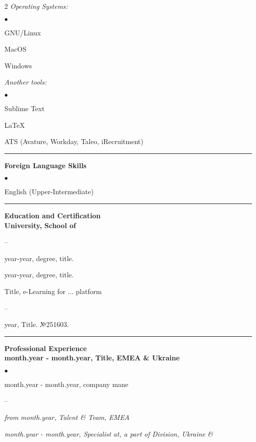 \documentclass[oneside,final,12pt]{extreport}
\newenvironment{compactlist}{
	\begin{list}{{$\bullet$}}{
		\setlength\leftmargin{0.4cm}
		\setlength\partopsep{0pt}
		\setlength\parskip{0pt}
		\setlength\parsep{0pt}
		\setlength\topsep{0pt}
		\setlength\itemsep{0pt}
	}
}{
	\end{list}
}
\newenvironment{innerlist}{
	\begin{list}{--}{
		\setlength\leftmargin{0.8cm}
		\setlength\partopsep{0pt}
		\setlength\parskip{0pt}
		\setlength\parsep{0pt}
		\setlength\topsep{0pt}
		\setlength\itemsep{0pt}
	}
}{
	\end{list}
}
\begin{document}
\begin{multicols}{2}
\textsl{Operating Systems:}
	\begin{compactlist}
		\item GNU/Linux
		\item MacOS
		\item Windows
	\end{compactlist}
\textsl{Another tools:}
	\begin{compactlist}
		\item Sublime Text
		\item LaTeX
		\item ATS (Avature, Workday, Taleo, iRecruitment)
	\end{compactlist}
\end{multicols}
\rule{\textwidth}{0.4pt}

\bfseries
Foreign Language Skills
\mdseries
\begin{compactlist}
	\item English (Upper-Intermediate)
\end{compactlist}
\rule{\textwidth}{0.4pt}

\bfseries
Education and Certification
\mdseries \\[3pt]	
University, School of  	
	 \begin{innerlist}	
	 \item year-year, degree, title. 
	 \item year-year, degree, title. 
	 \end{innerlist}	
Title, e-Learning for ... platform 
	 \begin{innerlist}	
	 \item year, Title. №251603.
	 \end{innerlist}	 
\rule{\textwidth}{0.4pt}

\bfseries
Professional Experience
\mdseries \\[1pt] 
month.year - month.year, Title, EMEA \& Ukraine 
     \begin{compactlist}
	 \item month.year - month.year, company mane
	     \begin{innerlist} 
	     \item \textsl{from month.year, Talent \& Team, EMEA} 
	     \item \textsl{month.year - month.year, Specialist at, a part of Division, Ukraine \& } 
        \end{innerlist} 
     \end{compactlist}
\end{document}
